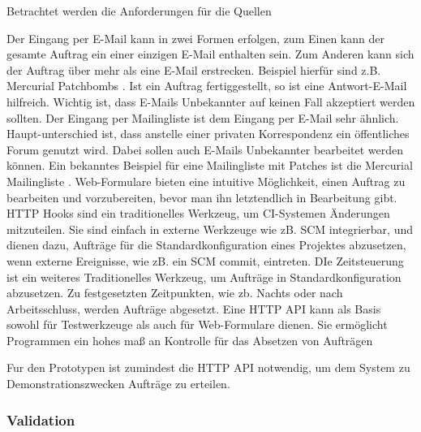 Betrachtet werden die Anforderungen für die Quellen
\begin{description}
    \dhitem[E-Mail]
        Der Eingang per E-Mail kann in zwei Formen erfolgen,
        zum Einen kann der gesamte Auftrag ein einer einzigen E-Mail enthalten sein.
        Zum Anderen kann sich der Auftrag über mehr als eine E-Mail erstrecken.
        Beispiel hierfür sind z.B. Mercurial Patchbombs \cite{mercurial:patchbomb}.
        Ist ein Auftrag fertiggestellt, so ist eine Antwort-E-Mail hilfreich.
        Wichtig ist, dass E-Mails Unbekannter auf keinen Fall
        akzeptiert werden sollten.
    \dhitem[Mailingliste]
        Der Eingang per Mailingliste ist dem Eingang per E-Mail sehr ähnlich.
        Haupt-unterschied ist, dass anstelle einer privaten Korrespondenz
        ein öffentliches Forum genutzt wird. Dabei sollen auch E-Mails Unbekannter 
        bearbeitet werden können.
        Ein bekanntes Beispiel für eine Mailingliste mit Patches
        ist die Mercurial Mailingliste \cite{mercurial:mailingliste}.
        Web-Formulare bieten eine intuitive Möglichkeit,
        einen Auftrag zu bearbeiten und vorzubereiten,
        bevor man ihn letztendlich in Bearbeitung gibt.
        HTTP Hooks sind ein traditionelles Werkzeug,
        um \ac{CI}-Systemen Änderungen mitzuteilen.
        Sie sind einfach in externe Werkzeuge wie zB. \ac{SCM} integrierbar,
        und dienen dazu, Aufträge für die Standardkonfiguration
        eines Projektes abzusetzen, wenn externe Ereignisse,
        wie zB. ein SCM commit, eintreten.
    \dhitem[Zeitsteuerung]
        DIe Zeitsteuerung ist ein weiteres Traditionelles Werkzeug,
        um Aufträge in Standardkonfiguration abzusetzen.
        Zu festgesetzten Zeitpunkten, wie zb. Nachts oder nach
        Arbeitsschluss, werden Aufträge abgesetzt.
        Eine HTTP API kann als Basis sowohl für Testwerkzeuge
        als auch für Web-Formulare dienen.
        Sie ermöglicht Programmen ein hohes maß an Kontrolle
        für das Absetzen von Aufträgen
\end{description}

Fur den Prototypen ist zumindest die HTTP API notwendig,
um dem System zu Demonstrationszwecken Aufträge zu erteilen.


\subsubsection{Validation}

